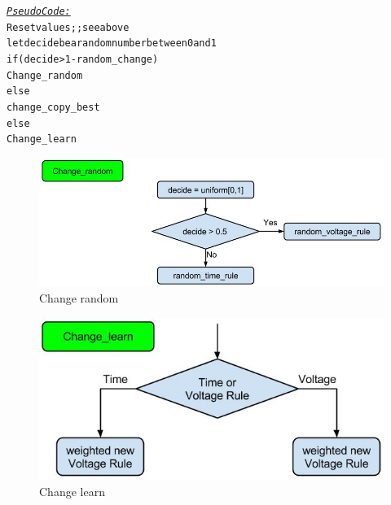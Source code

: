\documentclass[a4paper]{article}
\begin{document}
\begin{alltt}
 \underline{\textit{Pseudo Code:}}
Reset values ;; see above 
let decide be a random number between 0 and 1
if (decide > 1 - random_change)
    Change_random
else
    change_copy_best
    else 
        Change_learn
\end{alltt}
\begin{figure}[!ht]
\includegraphics[width =\textwidth]{change_random.jpg}
\caption{Change random}
\label{change_random}
\end{figure}
\begin{figure}[!ht]
\includegraphics[width =\textwidth]{change_learn.jpg}
\caption{Change learn}
\label{change_learn}
\end{figure}
\end{document}
